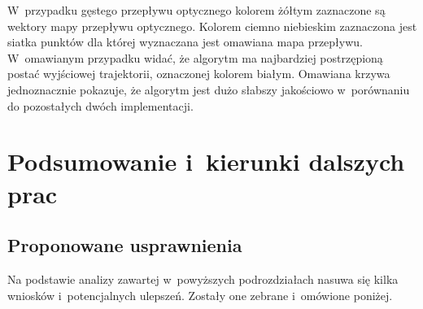     W~przypadku gęstego przepływu optycznego kolorem żółtym zaznaczone są wektory mapy przepływu optycznego. Kolorem ciemno niebieskim zaznaczona jest siatka punktów dla której wyznaczana jest omawiana mapa przepływu. W~omawianym przypadku widać, że algorytm ma najbardziej postrzępioną postać wyjściowej trajektorii, oznaczonej kolorem białym. Omawiana krzywa jednoznacznie pokazuje, że algorytm jest dużo słabszy jakościowo w~porównaniu do pozostałych dwóch implementacji.

\chapter{Podsumowanie i~kierunki dalszych prac}\label{Chapter_Podsumowanie}

  \section{Proponowane usprawnienia}\label{Section_Usprawnienia}

    Na podstawie analizy zawartej w~powyższych podrozdziałach nasuwa się kilka wniosków i~potencjalnych ulepszeń. Zostały one zebrane i~omówione poniżej.


